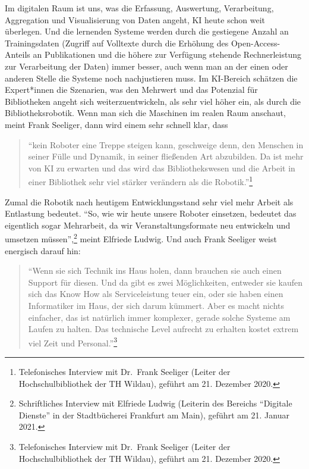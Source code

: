 \documentclass[a4paper,
fontsize=11pt,
oneside,
numbers=noperiodatend,
parskip=half-,
bibliography=totoc,
final
]{scrartcl}
\begin{document}
Im digitalen Raum ist uns, was die Erfassung, Auswertung, Verarbeitung,
Aggregation und Visualisierung von Daten angeht, KI heute schon weit
überlegen. Und die lernenden Systeme werden durch die gestiegene Anzahl
an Trainingsdaten (Zugriff auf Volltexte durch die Erhöhung des Open-Access-Anteils an Publikationen und die höhere zur Verfügung stehende
Rechnerleistung zur Verarbeitung der Daten) immer besser, auch wenn man
an der einen oder anderen Stelle die Systeme noch nachjustieren muss. Im
KI-Bereich schätzen die Expert*innen die Szenarien, was den Mehrwert und
das Potenzial für Bibliotheken angeht sich weiterzuentwickeln, als sehr
viel höher ein, als durch die Bibliotheksrobotik. Wenn man sich die
Maschinen im realen Raum anschaut, meint Frank Seeliger, dann wird einem
sehr schnell klar, dass 

\begin{quote}
\enquote{kein Roboter eine Treppe steigen kann,
geschweige denn, den Menschen in seiner Fülle und Dynamik, in seiner
fließenden Art abzubilden. Da ist mehr von KI zu erwarten und das wird
das Bibliothekswesen und die Arbeit in einer Bibliothek sehr viel
stärker verändern als die Robotik.}\footnote{Telefonisches Interview
  mit Dr.~Frank Seeliger (Leiter der Hochschulbibliothek der TH Wildau),
  geführt am 21. Dezember 2020.} 
\end{quote}

Zumal die Robotik
nach heutigem Entwicklungsstand sehr viel mehr Arbeit als Entlastung
bedeutet. \enquote{So, wie wir heute unsere Roboter einsetzen, bedeutet
das eigentlich sogar Mehrarbeit, da wir Veranstaltungsformate neu
entwickeln und umsetzen müssen},\footnote{Schriftliches Interview mit
  Elfriede Ludwig (Leiterin des Bereichs \enquote{Digitale Dienste} in der
  Stadtbücherei Frankfurt am Main), geführt am 21. Januar 2021.} meint
Elfriede Ludwig. Und auch Frank Seeliger weist energisch darauf hin:

\begin{quote}
\enquote{Wenn sie sich Technik ins Haus holen, dann brauchen sie auch
einen Support für diesen. Und da gibt es zwei Möglichkeiten, entweder
sie kaufen sich das Know How als Serviceleistung teuer ein, oder sie
haben einen Informatiker im Haus, der sich darum kümmert. Aber es macht
nichts einfacher, das ist natürlich immer komplexer, gerade solche
Systeme am Laufen zu halten. Das technische Level aufrecht zu erhalten
kostet extrem viel Zeit und Personal.}\footnote{Telefonisches Interview
  mit Dr.~Frank Seeliger (Leiter der Hochschulbibliothek der TH Wildau),
  geführt am 21. Dezember 2020.}
\end{quote}
\end{document}
